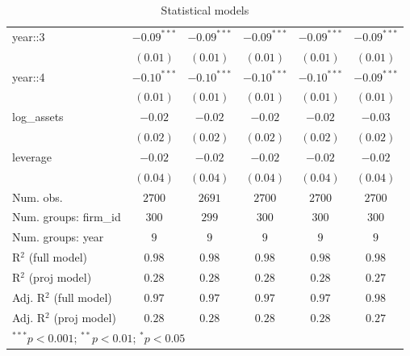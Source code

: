\begin{table}
\begin{center}
\begin{tabular}{l c c c c c}
year::3                 & $-0.09^{***}$ & $-0.09^{***}$ & $-0.09^{***}$ & $-0.09^{***}$ & $-0.09^{***}$ \\
                        & $(0.01)$      & $(0.01)$      & $(0.01)$      & $(0.01)$      & $(0.01)$      \\
year::4                 & $-0.10^{***}$ & $-0.10^{***}$ & $-0.10^{***}$ & $-0.10^{***}$ & $-0.09^{***}$ \\
                        & $(0.01)$      & $(0.01)$      & $(0.01)$      & $(0.01)$      & $(0.01)$      \\
log\_assets             & $-0.02$       & $-0.02$       & $-0.02$       & $-0.02$       & $-0.03$       \\
                        & $(0.02)$      & $(0.02)$      & $(0.02)$      & $(0.02)$      & $(0.02)$      \\
leverage                & $-0.02$       & $-0.02$       & $-0.02$       & $-0.02$       & $-0.02$       \\
                        & $(0.04)$      & $(0.04)$      & $(0.04)$      & $(0.04)$      & $(0.04)$      \\
\hline
Num. obs.               & $2700$        & $2691$        & $2700$        & $2700$        & $2700$        \\
Num. groups: firm\_id   & $300$         & $299$         & $300$         & $300$         & $300$         \\
Num. groups: year       & $9$           & $9$           & $9$           & $9$           & $9$           \\
R$^2$ (full model)      & $0.98$        & $0.98$        & $0.98$        & $0.98$        & $0.98$        \\
R$^2$ (proj model)      & $0.28$        & $0.28$        & $0.28$        & $0.28$        & $0.27$        \\
Adj. R$^2$ (full model) & $0.97$        & $0.97$        & $0.97$        & $0.97$        & $0.98$        \\
Adj. R$^2$ (proj model) & $0.28$        & $0.28$        & $0.28$        & $0.28$        & $0.27$        \\
\hline
\multicolumn{6}{l}{\scriptsize{$^{***}p<0.001$; $^{**}p<0.01$; $^{*}p<0.05$}}
\end{tabular}
\caption{Statistical models}
\label{table:coefficients}
\end{center}
\end{table}
